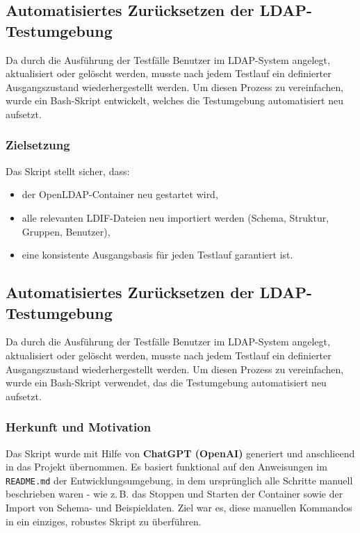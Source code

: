 
\subsection{Automatisiertes Zurücksetzen der LDAP-Testumgebung}

Da durch die Ausführung der Testfälle Benutzer im LDAP-System angelegt, aktualisiert oder gelöscht werden, musste nach jedem Testlauf ein definierter Ausgangszustand wiederhergestellt werden. Um diesen Prozess zu vereinfachen, wurde ein Bash-Skript entwickelt, welches die Testumgebung automatisiert neu aufsetzt.

\subsubsection*{Zielsetzung}

Das Skript stellt sicher, dass:

\begin{itemize}
  \item der OpenLDAP-Container neu gestartet wird,
  \item alle relevanten LDIF-Dateien neu importiert werden (Schema, Struktur, Gruppen, Benutzer),
  \item eine konsistente Ausgangsbasis für jeden Testlauf garantiert ist.
\end{itemize}


\subsection{Automatisiertes Zurücksetzen der LDAP-Testumgebung}

Da durch die Ausführung der Testfälle Benutzer im LDAP-System angelegt, aktualisiert oder gelöscht werden, musste nach jedem Testlauf ein definierter Ausgangszustand wiederhergestellt werden. Um diesen Prozess zu vereinfachen, wurde ein Bash-Skript verwendet, das die Testumgebung automatisiert neu aufsetzt.

\subsubsection*{Herkunft und Motivation}

Das Skript wurde mit Hilfe von \textbf{ChatGPT (OpenAI)} generiert und anschlieend in das Projekt übernommen. Es basiert funktional auf den Anweisungen im \texttt{README.md} der Entwicklungsumgebung, in dem ursprünglich alle Schritte manuell beschrieben waren - wie z.\,B. das Stoppen und Starten der Container sowie der Import von Schema- und Beispieldaten. Ziel war es, diese manuellen Kommandos in ein einziges, robustes Skript zu überführen.

